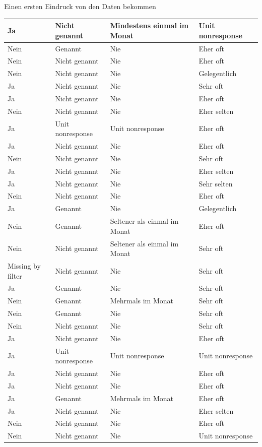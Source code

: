 \documentclass[ignorenonframetext,]{beamer}
\begin{document}
\begin{frame}{Einen ersten Eindruck von den Daten bekommen}
\begin{tabular}{l|l|l|l}
\hline
Ja & Nicht genannt & Mindestens einmal im Monat & Unit nonresponse\\
\hline
Nein & Genannt & Nie & Eher oft\\
\hline
Nein & Nicht genannt & Nie & Eher oft\\
\hline
Nein & Nicht genannt & Nie & Gelegentlich\\
\hline
Ja & Nicht genannt & Nie & Sehr oft\\
\hline
Ja & Nicht genannt & Nie & Eher oft\\
\hline
Nein & Nicht genannt & Nie & Eher selten\\
\hline
Ja & Unit nonresponse & Unit nonresponse & Eher oft\\
\hline
Ja & Nicht genannt & Nie & Eher oft\\
\hline
Nein & Nicht genannt & Nie & Sehr oft\\
\hline
Ja & Nicht genannt & Nie & Eher selten\\
\hline
Ja & Nicht genannt & Nie & Sehr selten\\
\hline
Nein & Nicht genannt & Nie & Eher oft\\
\hline
Ja & Genannt & Nie & Gelegentlich\\
\hline
Nein & Genannt & Seltener als einmal im Monat & Eher oft\\
\hline
Nein & Nicht genannt & Seltener als einmal im Monat & Sehr oft\\
\hline
Missing by filter & Nicht genannt & Nie & Sehr oft\\
\hline
Ja & Genannt & Nie & Sehr oft\\
\hline
Nein & Genannt & Mehrmals im Monat & Sehr oft\\
\hline
Nein & Genannt & Nie & Sehr oft\\
\hline
Nein & Nicht genannt & Nie & Sehr oft\\
\hline
Ja & Nicht genannt & Nie & Eher oft\\
\hline
Ja & Unit nonresponse & Unit nonresponse & Unit nonresponse\\
\hline
Ja & Nicht genannt & Nie & Eher oft\\
\hline
Ja & Nicht genannt & Nie & Eher oft\\
\hline
Ja & Genannt & Mehrmals im Monat & Eher oft\\
\hline
Ja & Nicht genannt & Nie & Eher selten\\
\hline
Nein & Nicht genannt & Nie & Eher oft\\
\hline
Nein & Nicht genannt & Nie & Unit nonresponse\\

\end{tabular}
\end{frame}
\end{document}
